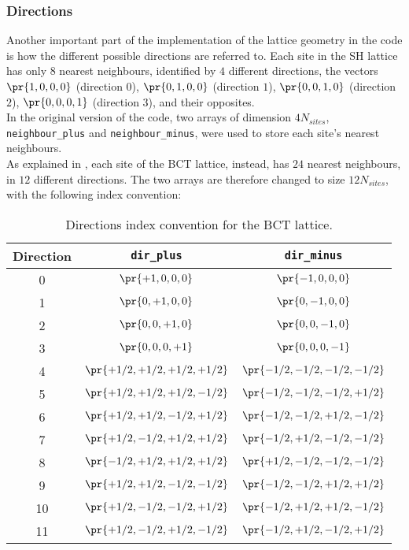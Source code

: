 \subsubsection{Directions}
Another important part of the implementation of the lattice geometry in the code is how the different possible directions are referred to.
Each site in the SH lattice has only $8$ nearest neighbours, identified by $4$ different directions, the vectors $\pr{1,0,0,0}$ (direction $0$), $\pr{0,1,0,0}$ (direction $1$), $\pr{0,0,1,0}$ (direction $2$), $\pr{0,0,0,1}$ (direction $3$), and their opposites.\\
In the original version of the code, two arrays of dimension $4N_{sites}$, \texttt{neighbour\_plus} and \texttt{neighbour\_minus}, were used to store each site's nearest neighbours.\\
As explained in , each site of the BCT lattice, instead, has $24$ nearest neighbours, in $12$ different directions.
The two arrays are therefore changed to size $12N_{sites}$, with the following index convention:
\begin{table}[!htbp]
    \centering
    \begin{tabular}{ |c|c|c| }
        \hline
        Direction & \texttt{dir\_plus}  & \texttt{dir\_minus}  \\\hline\hline
        0  & $\pr{  +1,   0,   0,   0}$ & $\pr{  -1,   0,   0,   0}$ \\\hline
        1  & $\pr{   0,  +1,   0,   0}$ & $\pr{   0,  -1,   0,   0}$ \\\hline
        2  & $\pr{   0,   0,  +1,   0}$ & $\pr{   0,   0,  -1,   0}$ \\\hline
        3  & $\pr{   0,   0,   0,  +1}$ & $\pr{   0,   0,   0,  -1}$ \\\hline
        4  & $\pr{+1/2,+1/2,+1/2,+1/2}$ & $\pr{-1/2,-1/2,-1/2,-1/2}$ \\\hline
        5  & $\pr{+1/2,+1/2,+1/2,-1/2}$ & $\pr{-1/2,-1/2,-1/2,+1/2}$ \\\hline
        6  & $\pr{+1/2,+1/2,-1/2,+1/2}$ & $\pr{-1/2,-1/2,+1/2,-1/2}$ \\\hline
        7  & $\pr{+1/2,-1/2,+1/2,+1/2}$ & $\pr{-1/2,+1/2,-1/2,-1/2}$ \\\hline
        8  & $\pr{-1/2,+1/2,+1/2,+1/2}$ & $\pr{+1/2,-1/2,-1/2,-1/2}$ \\\hline
        9  & $\pr{+1/2,+1/2,-1/2,-1/2}$ & $\pr{-1/2,-1/2,+1/2,+1/2}$ \\\hline
        10 & $\pr{+1/2,-1/2,-1/2,+1/2}$ & $\pr{-1/2,+1/2,+1/2,-1/2}$ \\\hline
        11 & $\pr{+1/2,-1/2,+1/2,-1/2}$ & $\pr{-1/2,+1/2,-1/2,+1/2}$ \\\hline
    \end{tabular}
    \caption{Directions index convention for the BCT lattice.}
    \label{4T:DirsBCT}
\end{table}\\
